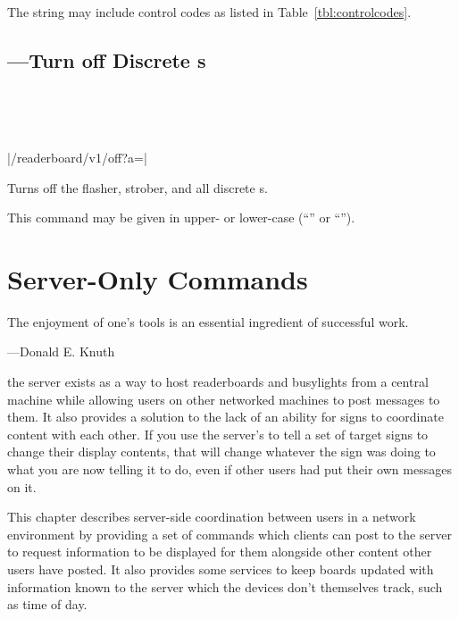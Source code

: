 The string may include control codes as listed in Table~\ref{tbl:controlcodes}.

\section{---Turn off Discrete \led s}
\begin{center}
\begin{bytefield}[endianness=little,bitwidth=0.11111\textwidth]{1}
	 \\
\end{bytefield}
\\
\begin{Coding}
	|/readerboard/v1/off?a=|
\end{Coding}
\end{center}

Turns off the flasher, strober, and all discrete \led s.

This command may be given in upper- or lower-case (``'' or ``'').


% 
\chapter{Server-Only Commands}
\epigraph{The enjoyment of one’s tools is an essential ingredient of successful work.}{---Donald E. Knuth}
 the server exists as a way to host readerboards and busylights from a central machine
while allowing users on other networked machines to post messages to them. It also provides a solution to the lack
of an ability for signs to coordinate content with each other. If you use the server's  to tell a
set of target signs to change their display contents, that will change whatever the sign was doing to what you
are now telling it to do, even if other users had put their own messages on it.

This chapter describes server-side coordination between users in a network environment by providing a set of
commands which clients can post to the server to request information to be displayed for them alongside other
content other users have posted. It also provides some services to keep boards updated with information
known to the server which the devices don't themselves track, such as time of day.

